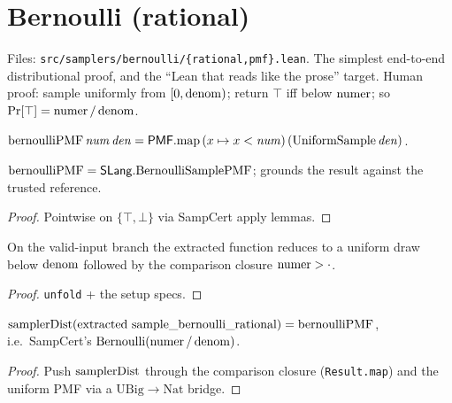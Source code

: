 \chapter{Bernoulli (rational)}\label{chap:bernoulli}

Files: \texttt{src/samplers/bernoulli/\{rational,pmf\}.lean}. The simplest
end-to-end distributional proof, and the ``Lean that reads like the prose''
target. Human proof: sample uniformly from \([0,\operatorname{denom})\); return \(\top\) iff
below \(\operatorname{numer}\); so \(\Pr[\top]=\operatorname{numer}/\operatorname{denom}\).

\begin{definition}\label{def:bernoulliPMF}
  \leanok
  \(\mathrm{bernoulliPMF}\,\mathit{num}\,\mathit{den} = \mathsf{PMF}.\mathrm{map}\,(x
  \mapsto x<\mathit{num})\,(\mathrm{UniformSample}\,\mathit{den})\). \statusDone
\end{definition}

\begin{lemma}\label{thm:bernoulliPMF-eq}
  \leanok
  \(\mathrm{bernoulliPMF} = \mathsf{SLang}.\mathrm{BernoulliSamplePMF}\); grounds the
  result against the trusted reference. \statusDone
\end{lemma}
\begin{proof}\leanok Pointwise on \(\{\top,\bot\}\) via SampCert apply lemmas. \end{proof}

\begin{theorem}\label{thm:bernoulli-eq-setup}
  \leanok
  On the valid-input branch the extracted function reduces to a uniform draw
  below \(\operatorname{denom}\) followed by the comparison closure \(\operatorname{numer}>\cdot\). \statusDone
\end{theorem}
\begin{proof}\leanok \texttt{unfold} + the setup specs. \end{proof}

\begin{theorem}\label{thm:bernoulli-rational}
  \leanok
  \(\mathrm{samplerDist}(\text{extracted sample\_bernoulli\_rational}) = \mathrm{bernoulliPMF}\),
  i.e.\ SampCert's \(\mathrm{Bernoulli}(\operatorname{numer}/\operatorname{denom})\). \statusDone
\end{theorem}
\begin{proof}\leanok
  Push \(\mathrm{samplerDist}\) through the comparison closure (\texttt{Result.map}) and the
  uniform PMF via a \(\mathrm{UBig}\!\to\!\mathrm{Nat}\) bridge.
\end{proof}

